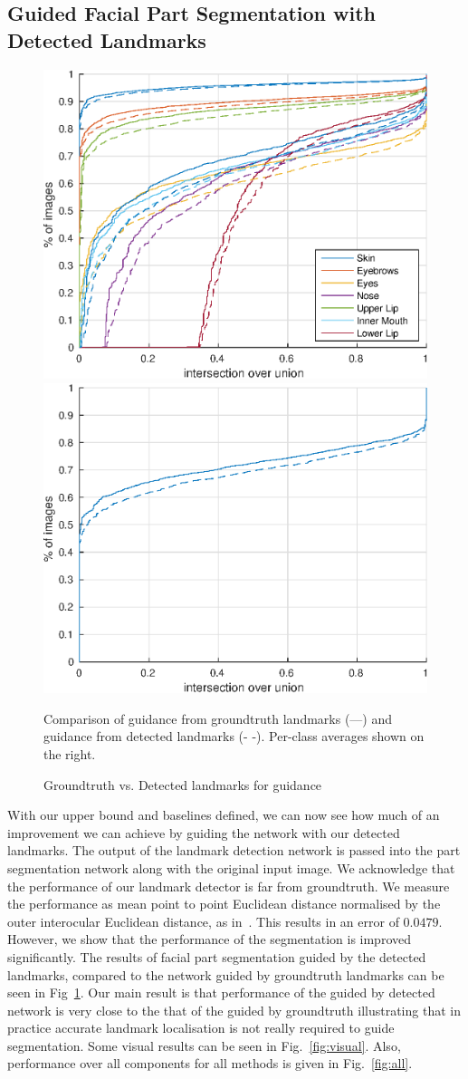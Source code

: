 \subsection{Guided Facial Part Segmentation with Detected Landmarks}

\begin{figure}
\includegraphics[width=0.5\linewidth]{figs/gtguided-vs-guided.eps}
\includegraphics[width=0.5\linewidth]{figs/gtguided-vs-guided-mean.eps}
\caption{Groundtruth vs. Detected landmarks for guidance}{Comparison
  of guidance from groundtruth landmarks (---) and guidance from
  detected landmarks (-{ }-). Per-class averages shown on the right.
}
\label{fig:gt-vs-det}
\end{figure}

With our upper bound and baselines defined, we can now see how much of
an improvement we can achieve by guiding the network with our
detected landmarks. The output of the landmark detection network is
passed into the part segmentation network along with the original
input image. We acknowledge that the performance of our landmark
detector is far from groundtruth. We measure the performance as mean
point to point Euclidean distance normalised by the outer interocular
Euclidean distance, as in~\cite{sagonas2013300}. This results in an
error of $0.0479$. However, we show that the performance of the
segmentation is improved significantly. The results of facial part
segmentation guided by the detected landmarks, compared to the network
guided by groundtruth landmarks can be seen in
Fig~\ref{fig:gt-vs-det}. Our main result is that performance of the
guided by detected network is very close to the that of the guided by
groundtruth illustrating that in practice accurate landmark
localisation is not really required to guide segmentation. Some visual
results can be seen in Fig.~\ref{fig:visual}. Also, performance over
all components for all methods is given in Fig.~\ref{fig:all}.



